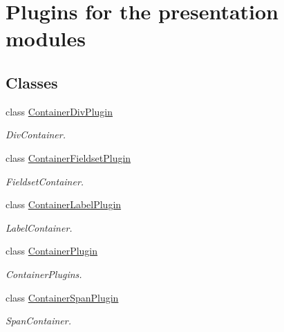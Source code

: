 \section{Plugins for the presentation modules}
\label{group__OWL__UI__PLUGINS}
\subsection*{Classes}
\begin{DoxyCompactItemize}
\item 
class \hyperlink{classContainerDivPlugin}{ContainerDivPlugin}
\begin{DoxyCompactList}\small\item\em DivContainer. \item\end{DoxyCompactList}\item 
class \hyperlink{classContainerFieldsetPlugin}{ContainerFieldsetPlugin}
\begin{DoxyCompactList}\small\item\em FieldsetContainer. \item\end{DoxyCompactList}\item 
class \hyperlink{classContainerLabelPlugin}{ContainerLabelPlugin}
\begin{DoxyCompactList}\small\item\em LabelContainer. \item\end{DoxyCompactList}\item 
class \hyperlink{classContainerPlugin}{ContainerPlugin}
\begin{DoxyCompactList}\small\item\em ContainerPlugins. \item\end{DoxyCompactList}\item 
class \hyperlink{classContainerSpanPlugin}{ContainerSpanPlugin}
\begin{DoxyCompactList}\small\item\em SpanContainer. \item\end{DoxyCompactList}\end{DoxyCompactItemize}

